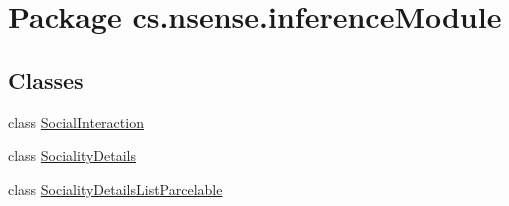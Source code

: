\hypertarget{namespacecs_1_1nsense_1_1inference_module}{\section{Package cs.\-nsense.\-inference\-Module}
\label{namespacecs_1_1nsense_1_1inference_module}
}
\subsection*{Classes}
\begin{DoxyCompactItemize}
\item 
class \hyperlink{classcs_1_1nsense_1_1inference_module_1_1_social_interaction}{Social\-Interaction}
\item 
class \hyperlink{classcs_1_1nsense_1_1inference_module_1_1_sociality_details}{Sociality\-Details}
\item 
class \hyperlink{classcs_1_1nsense_1_1inference_module_1_1_sociality_details_list_parcelable}{Sociality\-Details\-List\-Parcelable}
\end{DoxyCompactItemize}


